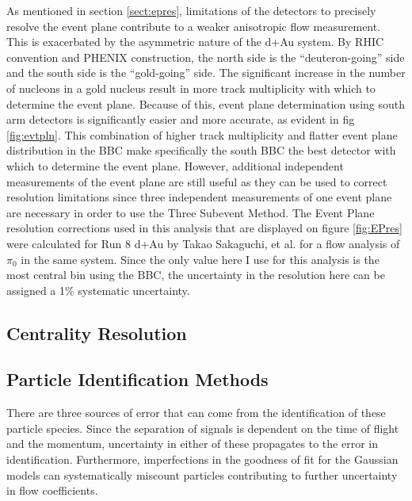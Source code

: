 As mentioned in section \ref{sect:epres}, limitations of the detectors to precisely resolve the event plane contribute to a weaker anisotropic flow measurement. This is exacerbated by the asymmetric nature of the d+Au system. By RHIC convention and PHENIX construction, the north side is the ``deuteron-going'' side and the south side is the ``gold-going'' side. The significant increase in the number of nucleons in a gold nucleus result in more track multiplicity with which to determine the event plane. Because of this, event plane determination using south arm detectors is significantly easier and more accurate, as evident in fig \ref{fig:evtpln}. This combination of higher track multiplicity and flatter event plane distribution in the BBC make specifically the south BBC the best detector with which to determine the event plane. However, additional independent measurements of the event plane are still useful as they can be used to correct resolution limitations since three independent measurements of one event plane are necessary in order to use the Three Subevent Method. The Event Plane resolution corrections used in this analysis that are displayed on figure \ref{fig:EPres} were calculated for Run 8 d+Au by Takao Sakaguchi, et al. for a flow analysis of $\pi_0$ in the same system. Since the only value here I use for this analysis is the most central bin using the BBC, the uncertainty in the resolution here can be assigned a 1\% systematic uncertainty.

\subsection{Centrality Resolution}

\subsection{Particle Identification Methods}
There are three sources of error that can come from the identification of these particle species. Since the separation of signals is dependent on the time of flight and the momentum, uncertainty in either of these propagates to the error in identification. Furthermore, imperfections in the goodness of fit for the Gaussian models can systematically miscount particles contributing to further uncertainty in flow coefficients.


